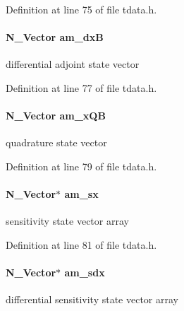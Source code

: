 Definition at line 75 of file tdata.\+h.

\hypertarget{struct_temp_data_a6dc87d123304fe3c6a20899fca777501}{}
\paragraph[{am\+\_\+dx\+B}]{\setlength{\rightskip}{0pt plus 5cm}N\+\_\+\+Vector am\+\_\+dx\+B}\label{struct_temp_data_a6dc87d123304fe3c6a20899fca777501}
differential adjoint state vector 

Definition at line 77 of file tdata.\+h.

\hypertarget{struct_temp_data_ac4099b4f6bf1f15d7d07b88993515da7}{}
\paragraph[{am\+\_\+x\+Q\+B}]{\setlength{\rightskip}{0pt plus 5cm}N\+\_\+\+Vector am\+\_\+x\+Q\+B}\label{struct_temp_data_ac4099b4f6bf1f15d7d07b88993515da7}
quadrature state vector 

Definition at line 79 of file tdata.\+h.

\hypertarget{struct_temp_data_a5253085927038bdeb7c327aa14470722}{}
\paragraph[{am\+\_\+sx}]{\setlength{\rightskip}{0pt plus 5cm}N\+\_\+\+Vector$\ast$ am\+\_\+sx}\label{struct_temp_data_a5253085927038bdeb7c327aa14470722}
sensitivity state vector array 

Definition at line 81 of file tdata.\+h.

\hypertarget{struct_temp_data_a2457438c1ae3ea571031bc3c2e440da2}{}
\paragraph[{am\+\_\+sdx}]{\setlength{\rightskip}{0pt plus 5cm}N\+\_\+\+Vector$\ast$ am\+\_\+sdx}\label{struct_temp_data_a2457438c1ae3ea571031bc3c2e440da2}
differential sensitivity state vector array 

